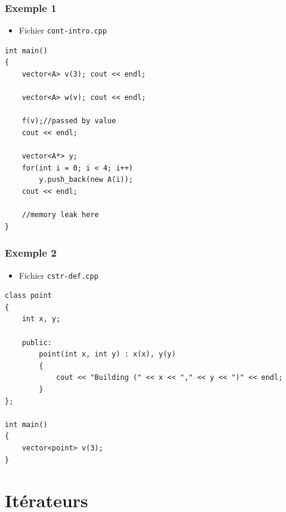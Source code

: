 \begin{frame}[containsverbatim]
\frametitle{Exemple 1}
\begin{itemize}
\item Fichier \texttt{cont-intro.cpp}
\end{itemize}
\begin{lstlisting}
int main()
{	
	vector<A> v(3); cout << endl;

	vector<A> w(v); cout << endl;

	f(v);//passed by value
	cout << endl;

	vector<A*> y;
	for(int i = 0; i < 4; i++)
		y.push_back(new A(i));
	cout << endl;

	//memory leak here		
}
\end{lstlisting}
\end{frame}

\begin{frame}[containsverbatim]
\frametitle{Exemple 2}
\begin{itemize}
\item Fichier \texttt{cstr-def.cpp}
\end{itemize}
\begin{lstlisting}
class point
{
	int x, y;

	public:
		point(int x, int y) : x(x), y(y) 
        { 
            cout << "Building (" << x << "," << y << ")" << endl;
        }
};

int main()
{
	vector<point> v(3);
}
\end{lstlisting}
\end{frame}

\section{Itérateurs}

